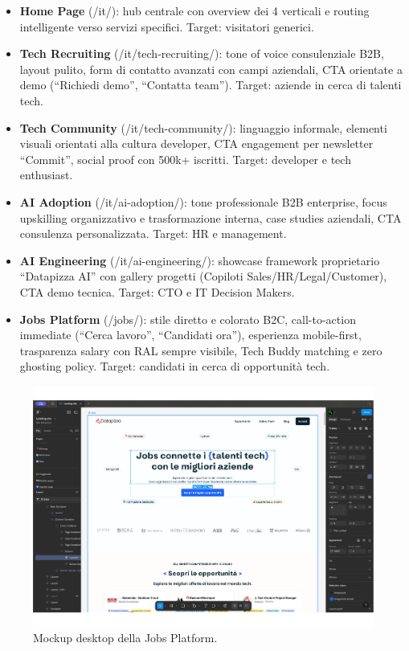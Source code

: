 \begin{itemize}
  \item \textbf{Home Page} (/it/): hub centrale con overview dei 4 verticali e 
  routing intelligente verso servizi specifici. Target: visitatori generici.
  
  \item \textbf{Tech Recruiting} (/it/tech-recruiting/): tone of voice 
  consulenziale B2B, layout pulito, form di contatto avanzati con campi aziendali, 
  CTA orientate a demo (``Richiedi demo'', ``Contatta team''). Target: aziende in 
  cerca di talenti tech.
  
  \item \textbf{Tech Community} (/it/tech-community/): linguaggio informale, 
  elementi visuali orientati alla cultura developer, CTA engagement per newsletter 
  ``Commit'', social proof con 500k+ iscritti. Target: developer e tech enthusiast.
  
  \item \textbf{AI Adoption} (/it/ai-adoption/): tone professionale B2B enterprise, 
  focus upskilling organizzativo e trasformazione interna, case studies aziendali, 
  CTA consulenza personalizzata. Target: HR e management.
  
  \item \textbf{AI Engineering} (/it/ai-engineering/): showcase framework 
  proprietario ``Datapizza AI'' con gallery progetti (Copiloti Sales/HR/Legal/Customer), 
  CTA demo tecnica. Target: CTO e IT Decision Makers.
  
  \item \textbf{Jobs Platform} (/jobs/): stile diretto e colorato B2C, 
  call-to-action immediate (``Cerca lavoro'', ``Candidati ora''), esperienza 
  mobile-first, trasparenza salary con RAL sempre visibile, Tech Buddy matching 
  e zero ghosting policy. Target: candidati in cerca di opportunità tech.
\end{itemize}

\begin{figure}[h!]
    \centering
    \includegraphics[width=1.1\textwidth]{chapters/figures/mockup.pdf}
    \caption{Mockup desktop della Jobs Platform.}
    \label{fig:jobs-desktop}
\end{figure}

